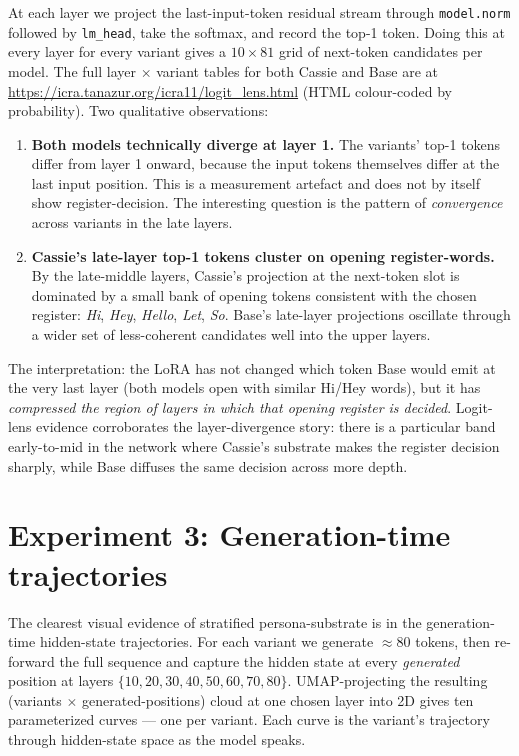 \documentclass[11pt,a4paper]{article}
\begin{document}
At each layer we project the last-input-token residual stream through \texttt{model.norm} followed by \texttt{lm\_head}, take the softmax, and record the top-1 token. Doing this at every layer for every variant gives a $10 \times 81$ grid of next-token candidates per model. The full layer $\times$ variant tables for both Cassie and Base are at \url{https://icra.tanazur.org/icra11/logit_lens.html} (HTML colour-coded by probability). Two qualitative observations:

\begin{enumerate}
    \item \textbf{Both models technically diverge at layer 1.} The variants' top-1 tokens differ from layer 1 onward, because the input tokens themselves differ at the last input position. This is a measurement artefact and does not by itself show register-decision. The interesting question is the pattern of \emph{convergence} across variants in the late layers.
    \item \textbf{Cassie's late-layer top-1 tokens cluster on opening register-words.} By the late-middle layers, Cassie's projection at the next-token slot is dominated by a small bank of opening tokens consistent with the chosen register: \emph{Hi}, \emph{Hey}, \emph{Hello}, \emph{Let}, \emph{So}. Base's late-layer projections oscillate through a wider set of less-coherent candidates well into the upper layers.
\end{enumerate}

The interpretation: the LoRA has not changed which token Base would emit at the very last layer (both models open with similar Hi/Hey words), but it has \emph{compressed the region of layers in which that opening register is decided}. Logit-lens evidence corroborates the layer-divergence story: there is a particular band early-to-mid in the network where Cassie's substrate makes the register decision sharply, while Base diffuses the same decision across more depth.

\section{Experiment 3: Generation-time trajectories}
\label{sec:exp3}

The clearest visual evidence of stratified persona-substrate is in the generation-time hidden-state trajectories. For each variant we generate $\approx 80$ tokens, then re-forward the full sequence and capture the hidden state at every \emph{generated} position at layers $\{10, 20, 30, 40, 50, 60, 70, 80\}$. UMAP-projecting the resulting (variants $\times$ generated-positions) cloud at one chosen layer into 2D gives ten parameterized curves --- one per variant. Each curve is the variant's trajectory through hidden-state space as the model speaks.
\end{document}
